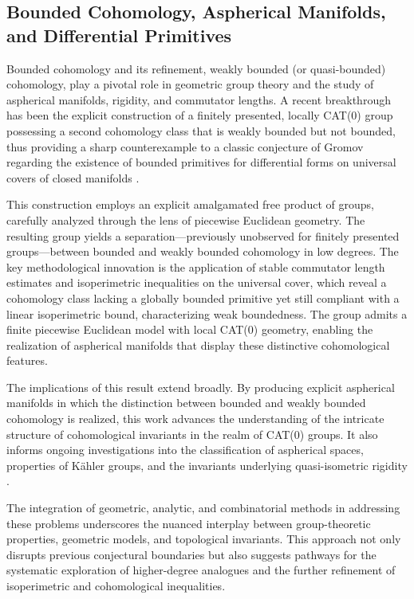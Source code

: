 \documentclass[sigconf]{acmart}
\begin{document}
\subsection{Bounded Cohomology, Aspherical Manifolds, and Differential Primitives}

Bounded cohomology and its refinement, weakly bounded (or quasi-bounded) cohomology, play a pivotal role in geometric group theory and the study of aspherical manifolds, rigidity, and commutator lengths. A recent breakthrough has been the explicit construction of a finitely presented, locally CAT(0) group possessing a second cohomology class that is weakly bounded but not bounded, thus providing a sharp counterexample to a classic conjecture of Gromov regarding the existence of bounded primitives for differential forms on universal covers of closed manifolds \cite{ref84}.

This construction employs an explicit amalgamated free product of groups, carefully analyzed through the lens of piecewise Euclidean geometry. The resulting group yields a separation—previously unobserved for finitely presented groups—between bounded and weakly bounded cohomology in low degrees. The key methodological innovation is the application of stable commutator length estimates and isoperimetric inequalities on the universal cover, which reveal a cohomology class lacking a globally bounded primitive yet still compliant with a linear isoperimetric bound, characterizing weak boundedness. The group admits a finite piecewise Euclidean model with local CAT(0) geometry, enabling the realization of aspherical manifolds that display these distinctive cohomological features.

The implications of this result extend broadly. By producing explicit aspherical manifolds in which the distinction between bounded and weakly bounded cohomology is realized, this work advances the understanding of the intricate structure of cohomological invariants in the realm of CAT(0) groups. It also informs ongoing investigations into the classification of aspherical spaces, properties of Kähler groups, and the invariants underlying quasi-isometric rigidity \cite{ref84}. 

The integration of geometric, analytic, and combinatorial methods in addressing these problems underscores the nuanced interplay between group-theoretic properties, geometric models, and topological invariants. This approach not only disrupts previous conjectural boundaries but also suggests pathways for the systematic exploration of higher-degree analogues and the further refinement of isoperimetric and cohomological inequalities. 
\end{document}
